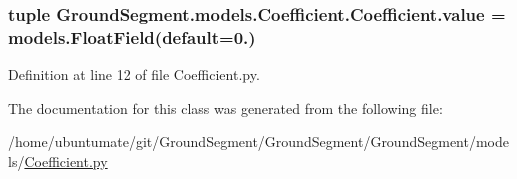 \hypertarget{class_ground_segment_1_1models_1_1_coefficient_1_1_coefficient_a47f7b36c3eb57045d7d2396d9515fbc6}{}
\subsubsection[{value}]{\setlength{\rightskip}{0pt plus 5cm}tuple Ground\+Segment.\+models.\+Coefficient.\+Coefficient.\+value = models.\+Float\+Field(default=0.)\hspace{0.3cm}{\ttfamily [static]}}\label{class_ground_segment_1_1models_1_1_coefficient_1_1_coefficient_a47f7b36c3eb57045d7d2396d9515fbc6}


Definition at line 12 of file Coefficient.\+py.



The documentation for this class was generated from the following file\+:\begin{DoxyCompactItemize}
\item 
/home/ubuntumate/git/\+Ground\+Segment/\+Ground\+Segment/\+Ground\+Segment/models/\hyperlink{_coefficient_8py}{Coefficient.\+py}\end{DoxyCompactItemize}
